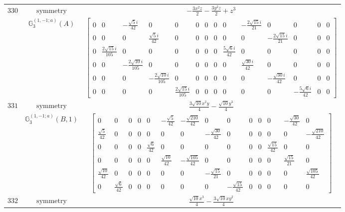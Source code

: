 \documentclass[fleqn,8pt,landscape]{jsarticle}
\begin{document}
\begin{longtable}{ccc}
$ 330 $ & $ \text{symmetry} $ & $ - \frac{3 x^{2} z}{2} - \frac{3 y^{2} z}{2} + z^{3} $ \\
$  $ & $ \mathbb{G}_{3}^{(1,-1;a)}(A) $ & $ \begin{bmatrix} 0 & 0 & - \frac{\sqrt{5} i}{42} & 0 & 0 & 0 & 0 & 0 & 0 & - \frac{2 \sqrt{15} i}{21} & 0 & 0 & 0 & 0 \\ 0 & 0 & 0 & \frac{\sqrt{5} i}{42} & 0 & 0 & 0 & 0 & 0 & 0 & - \frac{2 \sqrt{15} i}{21} & 0 & 0 & 0 \\ 0 & \frac{2 \sqrt{15} i}{105} & 0 & 0 & 0 & 0 & 0 & 0 & \frac{5 \sqrt{6} i}{42} & 0 & 0 & 0 & 0 & 0 \\ 0 & 0 & - \frac{2 \sqrt{10} i}{105} & 0 & 0 & 0 & 0 & 0 & 0 & \frac{\sqrt{30} i}{42} & 0 & 0 & 0 & 0 \\ 0 & 0 & 0 & - \frac{2 \sqrt{10} i}{105} & 0 & 0 & 0 & 0 & 0 & 0 & - \frac{\sqrt{30} i}{42} & 0 & 0 & 0 \\ 0 & 0 & 0 & 0 & \frac{2 \sqrt{15} i}{105} & 0 & 0 & 0 & 0 & 0 & 0 & - \frac{5 \sqrt{6} i}{42} & 0 & 0 \end{bmatrix} $ \\ \hline
$ 331 $ & $ \text{symmetry} $ & $ \frac{3 \sqrt{10} x^{2} y}{4} - \frac{\sqrt{10} y^{3}}{4} $ \\
$  $ & $ \mathbb{G}_{3}^{(1,-1;a)}(B,1) $ & $ \begin{bmatrix} 0 & 0 & 0 & 0 & 0 & - \frac{\sqrt{5}}{42} & - \frac{\sqrt{210}}{42} & 0 & 0 & 0 & 0 & 0 & - \frac{\sqrt{30}}{42} & 0 \\ \frac{\sqrt{5}}{42} & 0 & 0 & 0 & 0 & 0 & 0 & - \frac{\sqrt{30}}{42} & 0 & 0 & 0 & 0 & 0 & - \frac{\sqrt{210}}{42} \\ 0 & 0 & 0 & 0 & \frac{\sqrt{6}}{42} & 0 & 0 & 0 & 0 & 0 & 0 & \frac{\sqrt{15}}{42} & 0 & 0 \\ 0 & 0 & 0 & 0 & 0 & \frac{\sqrt{10}}{42} & - \frac{\sqrt{105}}{42} & 0 & 0 & 0 & 0 & 0 & \frac{\sqrt{15}}{21} & 0 \\ \frac{\sqrt{10}}{42} & 0 & 0 & 0 & 0 & 0 & 0 & - \frac{\sqrt{15}}{21} & 0 & 0 & 0 & 0 & 0 & \frac{\sqrt{105}}{42} \\ 0 & \frac{\sqrt{6}}{42} & 0 & 0 & 0 & 0 & 0 & 0 & - \frac{\sqrt{15}}{42} & 0 & 0 & 0 & 0 & 0 \end{bmatrix} $ \\ \hline
$ 332 $ & $ \text{symmetry} $ & $ \frac{\sqrt{10} x^{3}}{4} - \frac{3 \sqrt{10} x y^{2}}{4} $ \\

\end{longtable}
\end{document}
